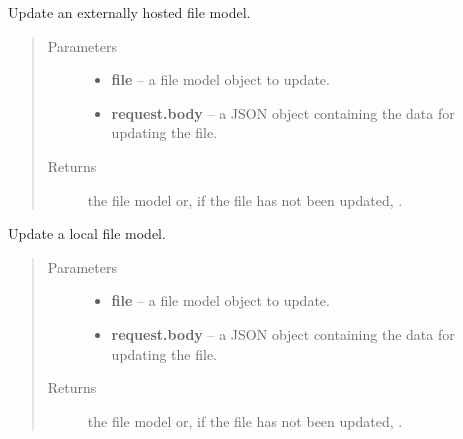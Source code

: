 \documentclass[letterpaper,10pt,english]{sphinxmanual}
\begin{document}
\begin{fulllineitems}
\label{api:onlinelinguisticdatabase.controllers.files.updateExternallyHostedFile}
Update an externally hosted file model.
\begin{quote}\begin{description}
\item[{Parameters}] \leavevmode\begin{itemize}
\item {} 
\textbf{file} -- a file model object to update.

\item {} 
\textbf{request.body} -- a JSON object containing the data for updating the file.

\end{itemize}

\item[{Returns}] \leavevmode
the file model or, if the file has not been updated, .

\end{description}\end{quote}

\end{fulllineitems}


\begin{fulllineitems}
\label{api:onlinelinguisticdatabase.controllers.files.updateFile}
Update a local file model.
\begin{quote}\begin{description}
\item[{Parameters}] \leavevmode\begin{itemize}
\item {} 
\textbf{file} -- a file model object to update.

\item {} 
\textbf{request.body} -- a JSON object containing the data for updating the file.

\end{itemize}

\item[{Returns}] \leavevmode
the file model or, if the file has not been updated, .

\end{description}\end{quote}

\end{fulllineitems}
\end{document}

